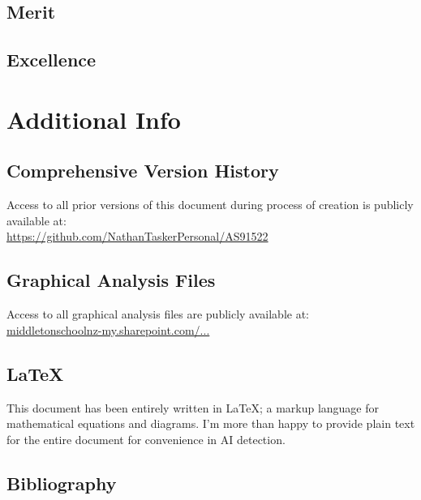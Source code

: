 \documentclass[11pt, a4paper]{article}
\begin{document}
	\subsection{Merit}
	\subsection{Excellence}
	\section{Additional Info}
	\subsection{Comprehensive Version History}
	Access to all prior versions of this document during process of creation is publicly available at:\\
	\url{https://github.com/NathanTaskerPersonal/AS91522}
	\subsection{Graphical Analysis Files}
	Access to all graphical analysis files are publicly available at:\\
	\href{https://middletonschoolnz-my.sharepoint.com/:f:/g/personal/taskern_middleton_school_nz/EhEmw21C2L9Fn9BYUy2ccwMBn6xCUF93vtfvtT_5_rkxbA?e=Tp02lP}{middletonschoolnz-my.sharepoint.com/...}
	\subsection{\LaTeX}
	This document has been entirely written in \LaTeX; a markup language for mathematical equations and diagrams. I'm more than happy to provide plain text for the entire document for convenience in AI detection.
	\subsection{Bibliography}
\end{document}

